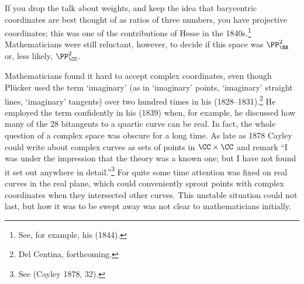 If you drop the talk about weights, and keep the idea that barycentric coordinates are best thought of as ratios of three numbers, you have projective coordinates; this was one of the contributions of Hesse in the 1840s.\footnote{See, for example, his (1844).}
Mathematicians were still reluctant, however, to decide if this space was $\PP_{\RR}^2$ or, less likely, $\PP_{\CC}^2$. 
 


Mathematicians found it  hard to accept complex coordinates,  even though Pl\"ucker used the term `imaginary'  (as in `imaginary' points, `imaginary' straight lines, `imaginary' tangents) over two hundred times in his   (1828--1831).\footnote{Del Centina, forthcoming.} He employed the term confidently in his (1839) when, for example, he discussed how many of the 28 bitangents to a quartic curve can be real. In fact, the whole question of a complex space was obscure for a long time. As late as 1878 Cayley could write about complex curves as sets of points in $\CC \times \CC$ and remark ``I was under the impression that the theory was a known one; but I have not found it set out anywhere in detail.''\footnote{See (Cayley 1878, 32).} For quite some time attention was fixed on real curves in the real plane, which could conveniently sprout points with complex coordinates when they intersected other curves. This unstable situation could not last, but how it was to be swept away was not clear to mathematicians initially. 



